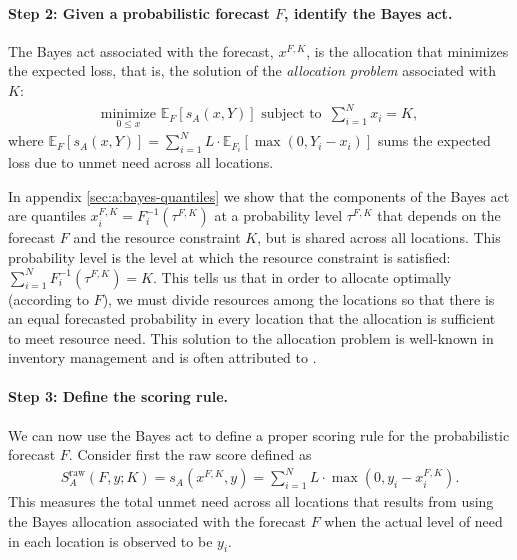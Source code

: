 \documentclass{article}\usepackage[]{graphicx}\usepackage[]{xcolor}
\providecommand{\DIFaddbegin}{} %
\providecommand{\DIFaddend}{} %
\newcommand{\DIFaddincludegraphics}[2][]{{\color{blue}\fbox{\DIFOincludegraphics[#1]{#2}}}} %
\DeclareRobustCommand{\DIFaddbegin}{\DIFOaddbegin \let\includegraphics\DIFaddincludegraphics} %
\DeclareRobustCommand{\DIFaddend}{\DIFOaddend \let\includegraphics\DIFOincludegraphics} %
\begin{document}
\paragraph{Step 2: Given a probabilistic forecast $F$, identify the Bayes act.} The Bayes act associated with the
forecast, $x^{F,K}$, is the allocation that minimizes the expected loss, that is, the solution of the \emph{allocation
problem} associated with $K$:
\begin{align}
  \underset{0 \leq x}{\mathrm{minimize}}\,\, \mathbb{E}_{F} [s_A(x, Y)] \text{ subject to }
  \, \sum_{i=1}^N x_i = K, \label{eqn:AP}
\end{align}
where $\mathbb{E}_{F} [s_A(x, Y)] = \sum_{i=1}^{N} L \cdot \mathbb{E}_{F_i}[\max(0, Y_i - x_i)]$ sums the expected loss
due to unmet need across all locations.

In appendix \ref{sec:a:bayes-quantiles} we show that the components of the Bayes act are quantiles 
$x_i^{F,K} = F_i^{-1}(\tau^{F,K})$ at a probability level $\tau^{F,K}$ that depends on the forecast $F$ and the resource
constraint $K$, but is shared across all locations. This probability level is the level at which the resource constraint
is satisfied: $\sum_{i=1}^N F_i^{-1}(\tau^{F,K}) = K$. This tells us that in order to allocate optimally (according to
$F$), we must divide resources among the locations so that there is an equal forecasted probability in every location
that the allocation is sufficient to meet resource need. This solution to the allocation problem is well-known in
inventory management and is often attributed to \cite{hadleywhitin1963}.

\paragraph{Step 3: Define the scoring rule.} We can now use the Bayes act to define a proper scoring rule for the
probabilistic forecast $F$. Consider first the raw score defined as
\begin{align}
  S_A^{\text{raw}}(F, y; K) = s_A(x^{F,K}, y) = \sum_{i=1}^N L \cdot \max(0, y_i - x_i^{F,K}). \DIFaddbegin \label{eqn:AS-raw}
\DIFaddend \end{align}
This measures the total unmet need across all locations that results from using the Bayes allocation associated with the
forecast $F$ when the actual level of need in each location is observed to be $y_i$.
\end{document}
